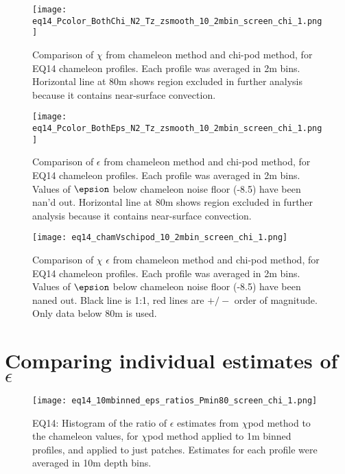 \documentclass[11pt]{article}
\begin{document}
\begin{figure}[htbp]
\texttt{[image: eq14\_Pcolor\_BothChi\_N2\_Tz\_zsmooth\_10\_2mbin\_screen\_chi\_1.png]}
\caption{Comparison of $\chi$ from chameleon method and chi-pod method, for EQ14 chameleon profiles. Each profile was averaged in 2m bins.  Horizontal line at 80m shows region excluded in further analysis because it contains near-surface convection.}
\label{chi_overview}
\end{figure}

\begin{figure}[htbp]
\texttt{[image: eq14\_Pcolor\_BothEps\_N2\_Tz\_zsmooth\_10\_2mbin\_screen\_chi\_1.png]}
\caption{Comparison of $\epsilon$ from chameleon method and chi-pod method, for EQ14 chameleon profiles. Each profile was averaged in 2m bins.  Values of $\epsion$ below chameleon noise floor (-8.5) have been nan'd out. Horizontal line at 80m shows region excluded in further analysis because it contains near-surface convection.}
\label{eps_overview}
\end{figure}



\begin{figure}[htbp]
\texttt{[image: eq14\_chamVschipod\_10\_2mbin\_screen\_chi\_1.png]}
\caption{Comparison of $\chi$ $\epsilon$ from chameleon method and chi-pod method, for EQ14 chameleon profiles. Each profile was averaged in 2m bins.  Values of $\epsion$ below chameleon noise floor (-8.5) have been naned out. Black line is 1:1, red lines are $+/-$ order of magnitude. Only data below 80m is used.}
\label{chamVschi}
\end{figure}




\clearpage
\section{Comparing individual estimates of $\epsilon$}

\begin{figure}[htbp]
\texttt{[image: eq14\_10mbinned\_eps\_ratios\_Pmin80\_screen\_chi\_1.png]}
\caption{EQ14: Histogram of the ratio of $\epsilon$ estimates from $\chi$pod method to the chameleon values, for $\chi$pod method applied to 1m binned profiles, and applied to just patches. Estimates for each profile were averaged in 10m depth bins.}
\label{epsrathist_eq14}
\end{figure}
\end{document}
